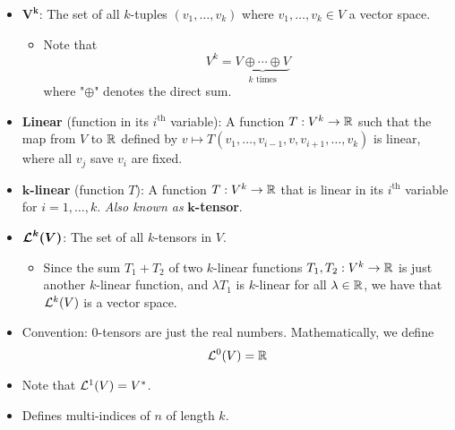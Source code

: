 \documentclass[../notes.tex]{subfiles}
\begin{document}
\begin{itemize}
\begin{proof}
        \begin{equation*}
            [A^*f_i^*](e_j) = \left[ \sum_{k=1}^nc_{k,i}e_k^* \right](e_j)
            = c_{j,i}
        \end{equation*}
        and
        \begin{equation*}
            [A^*f_i^*](e_j) = f_i^*(Ae_j)
            = f_i^*\left( \sum_{k=1}^ma_{k,j}f_k \right)
            = a_{i,j}
        \end{equation*}
        so transitivity implies the desired result.
    \end{proof}
    \item {}$\bm{V^k}$: The set of all $k$-tuples $(v_1,\dots,v_k)$ where $v_1,\dots,v_k\in V$ a vector space.
    \begin{itemize}
        \item Note that
        \begin{equation*}
            V^k = \underbrace{V\oplus\cdots\oplus V}_{k\text{ times}}
        \end{equation*}
        where "$\oplus$" denotes the direct sum.
    \end{itemize}
    \item \textbf{Linear} (function in its $i^\text{th}$ variable): A function $T:V^k\to\R$ such that the map from $V$ to $\R$ defined by $v\mapsto T(v_1,\dots,v_{i-1},v,v_{i+1},\dots,v_k)$ is linear, where all $v_j$ save $v_i$ are fixed.
    \item \textbf{$\bm{k}$-linear} (function $T$): A function $T:V^k\to\R$ that is linear in its $i^\text{th}$ variable for $i=1,\dots,k$. \emph{Also known as} \textbf{$\bm{k}$-tensor}.
    \item $\bm{\lin[k]{V}}$: The set of all $k$-tensors in $V$.
    \begin{itemize}
        \item Since the sum $T_1+T_2$ of two $k$-linear functions $T_1,T_2:V^k\to\R$ is just another $k$-linear function, and $\lambda T_1$ is $k$-linear for all $\lambda\in\R$, we have that $\lin[k]{V}$ is a vector space.
    \end{itemize}
    \item Convention: 0-tensors are just the real numbers. Mathematically, we define
    \begin{equation*}
        \lin[0]{V} = \R
    \end{equation*}
    \item Note that $\lin[1]{V}=V^*$.
    \item Defines multi-indices of $n$ of length $k$.

\end{itemize}
\end{document}

